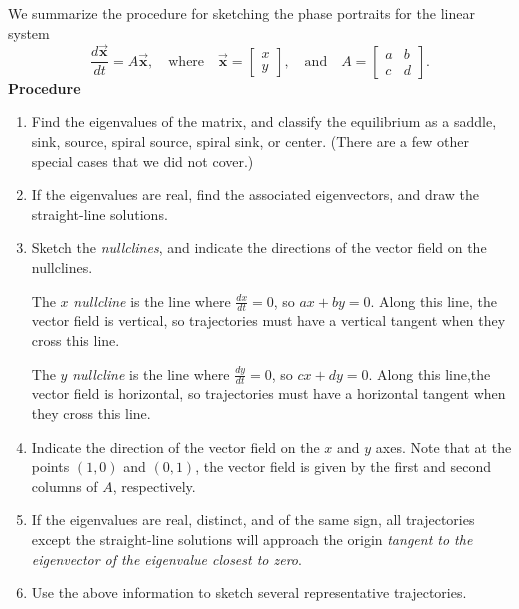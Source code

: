 \documentclass[reqno]{immbook}
\newcommand{\BX}{\vec{\textbf{x}}}
\numberwithin{equation}{chapter}
\numberwithin{question}{section}
\numberwithin{theorem}{chapter}
\numberwithin{figure}{chapter}
\theoremstyle{definition}
\begin{document}
\noindent
We summarize the procedure for sketching the phase portraits for
the linear system
\[
    \frac{d\BX}{dt} = A\BX, \quad \textrm{where} \quad
    \BX=\begin{bmatrix} x \\ y \end{bmatrix},
    \quad \textrm{and} \quad
    A = \begin{bmatrix} a & b \\ c & d \end{bmatrix}.
\]
\noindent
\textbf{Procedure}
\begin{enumerate}
\item
Find the eigenvalues of the matrix, and classify the equilibrium as a
saddle, sink, source, spiral source, spiral sink, or center.
(There are a few other special cases that we did not cover.)
\item
If the eigenvalues are real, find the associated eigenvectors, and
draw the straight-line solutions.
\item  Sketch the \emph{nullclines}, and indicate the
directions of the vector field on the nullclines.

The $x$ \emph{nullcline} is the line where $\frac{dx}{dt}=0$,
so $ax+by=0$. Along this line, the vector field is vertical, so trajectories
must have a vertical tangent when they cross this line.

The $y$ \emph{nullcline} is the line where $\frac{dy}{dt}=0$, so
$cx+dy=0$.  Along this line,the vector field is horizontal, so
trajectories must have a horizontal tangent when they cross this line.
 
\item Indicate the direction of the vector field on the $x$ and $y$ axes.
Note that at the points $(1,0)$ and $(0,1)$, the
vector field is given by the first and second columns of $A$, respectively.
\item
If the eigenvalues are real, distinct, and of the same sign,
all trajectories except the straight-line solutions
will approach the origin \emph{tangent to the eigenvector
of the eigenvalue closest to zero}.
\item Use the above information to sketch several representative trajectories.
\end{enumerate}

\newpage
\end{document}
